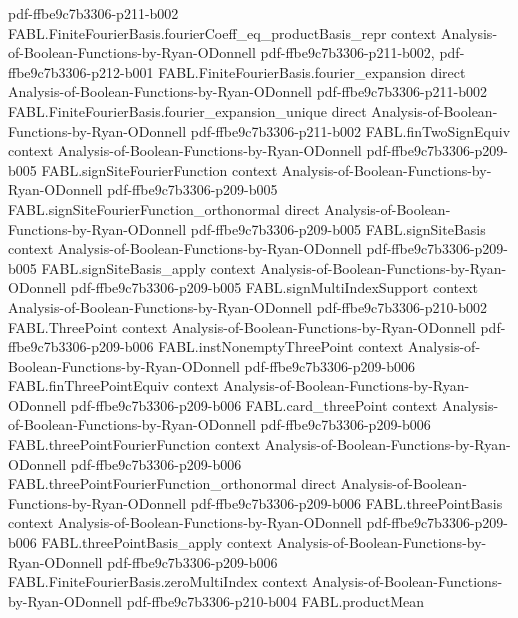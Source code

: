 \begin{theorem}
  {pdf-ffbe9c7b3306-p211-b002}
\proofstep
  {FABL.FiniteFourierBasis.fourierCoeff_eq_productBasis_repr}
  {context}
  {Analysis-of-Boolean-Functions-by-Ryan-ODonnell}
  {pdf-ffbe9c7b3306-p211-b002,
    pdf-ffbe9c7b3306-p212-b001}
\proofstep
  {FABL.FiniteFourierBasis.fourier_expansion}
  {direct}
  {Analysis-of-Boolean-Functions-by-Ryan-ODonnell}
  {pdf-ffbe9c7b3306-p211-b002}
\proofstep
  {FABL.FiniteFourierBasis.fourier_expansion_unique}
  {direct}
  {Analysis-of-Boolean-Functions-by-Ryan-ODonnell}
  {pdf-ffbe9c7b3306-p211-b002}
\proofstep
  {FABL.finTwoSignEquiv}
  {context}
  {Analysis-of-Boolean-Functions-by-Ryan-ODonnell}
  {pdf-ffbe9c7b3306-p209-b005}
\proofstep
  {FABL.signSiteFourierFunction}
  {context}
  {Analysis-of-Boolean-Functions-by-Ryan-ODonnell}
  {pdf-ffbe9c7b3306-p209-b005}
\proofstep
  {FABL.signSiteFourierFunction_orthonormal}
  {direct}
  {Analysis-of-Boolean-Functions-by-Ryan-ODonnell}
  {pdf-ffbe9c7b3306-p209-b005}
\proofstep
  {FABL.signSiteBasis}
  {context}
  {Analysis-of-Boolean-Functions-by-Ryan-ODonnell}
  {pdf-ffbe9c7b3306-p209-b005}
\proofstep
  {FABL.signSiteBasis_apply}
  {context}
  {Analysis-of-Boolean-Functions-by-Ryan-ODonnell}
  {pdf-ffbe9c7b3306-p209-b005}
\proofstep
  {FABL.signMultiIndexSupport}
  {context}
  {Analysis-of-Boolean-Functions-by-Ryan-ODonnell}
  {pdf-ffbe9c7b3306-p210-b002}
\proofstep
  {FABL.ThreePoint}
  {context}
  {Analysis-of-Boolean-Functions-by-Ryan-ODonnell}
  {pdf-ffbe9c7b3306-p209-b006}
\proofstep
  {FABL.instNonemptyThreePoint}
  {context}
  {Analysis-of-Boolean-Functions-by-Ryan-ODonnell}
  {pdf-ffbe9c7b3306-p209-b006}
\proofstep
  {FABL.finThreePointEquiv}
  {context}
  {Analysis-of-Boolean-Functions-by-Ryan-ODonnell}
  {pdf-ffbe9c7b3306-p209-b006}
\proofstep
  {FABL.card_threePoint}
  {context}
  {Analysis-of-Boolean-Functions-by-Ryan-ODonnell}
  {pdf-ffbe9c7b3306-p209-b006}
\proofstep
  {FABL.threePointFourierFunction}
  {context}
  {Analysis-of-Boolean-Functions-by-Ryan-ODonnell}
  {pdf-ffbe9c7b3306-p209-b006}
\proofstep
  {FABL.threePointFourierFunction_orthonormal}
  {direct}
  {Analysis-of-Boolean-Functions-by-Ryan-ODonnell}
  {pdf-ffbe9c7b3306-p209-b006}
\proofstep
  {FABL.threePointBasis}
  {context}
  {Analysis-of-Boolean-Functions-by-Ryan-ODonnell}
  {pdf-ffbe9c7b3306-p209-b006}
\proofstep
  {FABL.threePointBasis_apply}
  {context}
  {Analysis-of-Boolean-Functions-by-Ryan-ODonnell}
  {pdf-ffbe9c7b3306-p209-b006}
\proofstep
  {FABL.FiniteFourierBasis.zeroMultiIndex}
  {context}
  {Analysis-of-Boolean-Functions-by-Ryan-ODonnell}
  {pdf-ffbe9c7b3306-p210-b004}
\proofstep
  {FABL.productMean}

\end{theorem}
